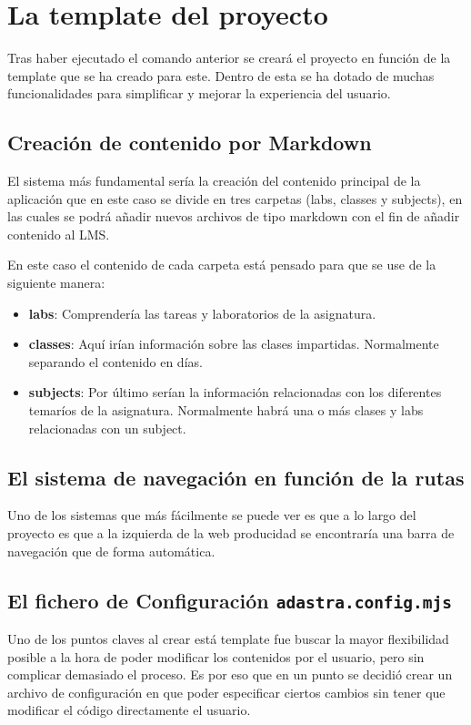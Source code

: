 \section{La template del proyecto}
Tras haber ejecutado el comando anterior se creará el proyecto en función de la template que se ha creado para este. Dentro de esta se ha dotado de muchas funcionalidades para simplificar y mejorar la experiencia del usuario.

\subsection{Creación de contenido por Markdown}
El sistema más fundamental sería la creación del contenido principal de la aplicación que en este caso se divide en tres carpetas (labs, classes y subjects), en las cuales se podrá añadir nuevos archivos de tipo markdown con el fin de añadir contenido al LMS.

En este caso el contenido de cada carpeta está pensado para que se use de la siguiente manera:
\begin{itemize}
    \item \textbf{labs}: Comprendería las tareas y laboratorios de la asignatura.
    \item \textbf{classes}: Aquí irían información sobre las clases impartidas. Normalmente separando el contenido en días.
    \item \textbf{subjects}: Por último serían la información relacionadas con los diferentes temaríos de la asignatura. Normalmente habrá una o más clases y labs relacionadas con un subject.
\end{itemize}

\subsection{El sistema de navegación en función de la rutas}
Uno de los sistemas que más fácilmente se puede ver es que a lo largo del proyecto es que a la izquierda de la web producidad se encontraría una barra de navegación que de forma automática.

\subsection{El fichero de Configuración {\tt adastra.config.mjs}} \label{diseño:data}
Uno de los puntos claves al crear está template fue buscar la mayor flexibilidad posible a la hora de poder modificar los contenidos por el usuario, pero sin complicar demasiado el proceso. Es por eso que en un punto se decidió crear un archivo de configuración en que poder especificar ciertos cambios sin tener que modificar el código directamente el usuario.

